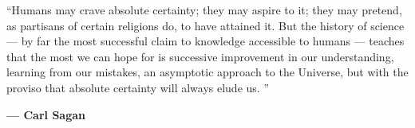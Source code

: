 \begin{center}
	“Humans may crave absolute certainty; they may aspire to it; they may pretend, as partisans of certain religions do, to have attained it.
	But the history of science — by far the most successful claim to knowledge accessible to humans — teaches that the most we can hope for is successive improvement in our understanding, learning from our mistakes, an asymptotic approach to the Universe, but with the proviso that absolute certainty will always elude us.
	”

	\vspace{1cm}
	\textbf{— Carl Sagan}
\end{center}

\newpage{}

